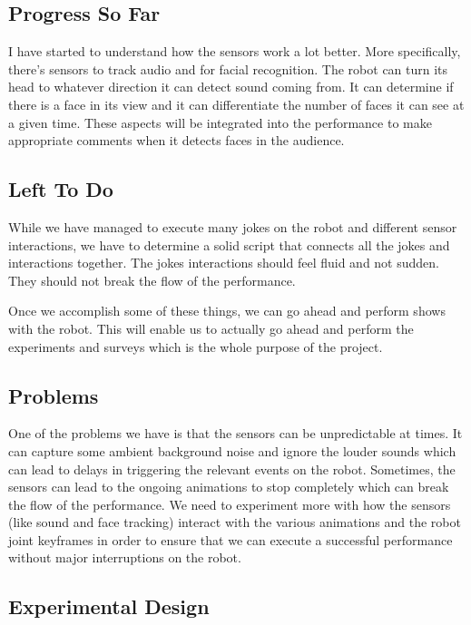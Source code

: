 \documentclass[onecolumn, draftclsnofoot,10pt, compsoc]{IEEEtran}
\begin{document}
\subsection{Progress So Far}
I have started to understand how the sensors work a lot better. More specifically, there's sensors to track audio and for facial recognition. The robot can turn its head to whatever direction it can detect sound coming from. It can determine if there is a face in its view and it can differentiate the number of faces it can see at a given time. These aspects will be integrated into the performance to make appropriate comments when it detects faces in the audience.

\subsection{Left To Do}

While we have managed to execute many jokes on the robot and different sensor interactions, we have to determine a solid script that connects all the jokes and interactions together. The jokes interactions should feel fluid and not sudden. They should not break the flow of the performance.

Once we accomplish some of these things, we can go ahead and perform shows with the robot. This will enable us to actually go ahead and perform the experiments and surveys which is the whole purpose of the project.

\subsection{Problems}

One of the problems we have is that the sensors can be unpredictable at times. It can capture some ambient background noise and ignore the louder sounds which can lead to delays in triggering the relevant events on the robot. Sometimes, the sensors can lead to the ongoing animations to stop completely which can break the flow of the performance. We need to experiment more with how the sensors (like sound and face tracking) interact with the various animations and the robot joint keyframes in order to ensure that we can execute a successful performance without major interruptions on the robot.

\subsection{Experimental Design}
\end{document}
